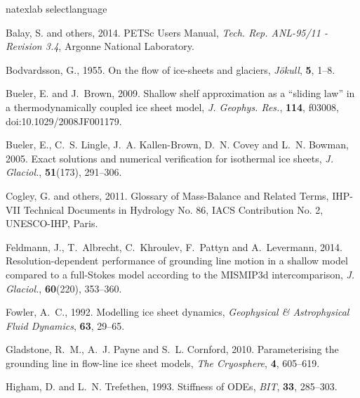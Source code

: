 \documentclass[twocolumn]{igs}
\begin{document}
%
%

\begin{thebibliography}{29}
\expandafter\ifx\csname natexlab\endcsname\relax\def\natexlab#1{#1}\fi
\expandafter\ifx\csname selectlanguage\endcsname\relax
  \def\selectlanguage#1{\relax}\fi

Balay, S. and others, 2014. {PETS}c {U}sers {M}anual, {\em Tech. Rep. ANL-95/11
  - Revision 3.4\/}, Argonne National Laboratory.

Bodvardsson, G., 1955. On the flow of ice-sheets and glaciers, {\em
  J{\"o}kull\/}, {\bf 5}, 1--8.

Bueler, E. and J.~Brown, 2009. Shallow shelf approximation as a ``sliding law''
  in a thermodynamically coupled ice sheet model, {\em J. Geophys. Res.\/},
  {\bf 114}, f03008, doi:10.1029/2008JF001179.

Bueler, E., C.~S. Lingle, J.~A. Kallen-Brown, D.~N. Covey and L.~N. Bowman,
  2005. Exact solutions and numerical verification for isothermal ice sheets,
  {\em J. Glaciol.\/}, {\bf 51}(173), 291--306.

Cogley, G. and others, 2011. Glossary of {M}ass-{B}alance and {R}elated
  {T}erms, {IHP-VII Technical Documents in Hydrology No. 86, IACS
  Contribution No. 2, UNESCO-IHP, Paris}.

Feldmann, J., T.~Albrecht, C.~Khroulev, F.~Pattyn and A.~Levermann, 2014.
  Resolution-dependent performance of grounding line motion in a shallow model
  compared to a full-{S}tokes model according to the {MISMIP3d}
  intercomparison, {\em J. Glaciol.\/}, {\bf 60}(220), 353--360.

Fowler, A.~C., 1992. Modelling ice sheet dynamics, {\em Geophysical \&
  Astrophysical Fluid Dynamics\/}, {\bf 63}, 29--65.

Gladstone, R.~M., A.~J. Payne and S.~L. Cornford, 2010. Parameterising the
  grounding line in flow-line ice sheet models, {\em The Cryosphere\/}, {\bf
  4}, 605--619.

Higham, D. and L.~N. Trefethen, 1993. Stiffness of {ODE}s, {\em BIT\/}, {\bf
  33}, 285--303.


\end{thebibliography}
\end{document}
